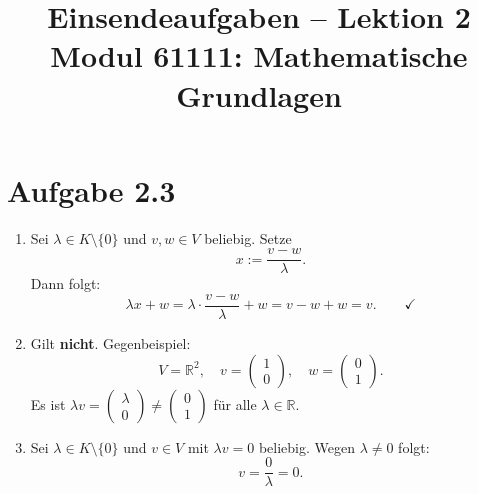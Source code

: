 \documentclass[a4paper,12pt]{article}
\title{Einsendeaufgaben -- Lektion 2\\[0.5em]
\large Modul 61111: Mathematische Grundlagen}
\author{}
\date{}
\begin{document}
\maketitle

\section*{Aufgabe 2.3}

\begin{enumerate}[label=\alph*)]

\item Sei $\lambda \in K \setminus \{0\}$ und $v, w \in V$ beliebig. Setze
\[
  x := \frac{v - w}{\lambda}.
\]
Dann folgt:
\[
  \lambda x + w = \lambda \cdot \frac{v - w}{\lambda} + w = v - w + w = v. \qquad \checkmark
\]

\item Gilt \textbf{nicht}. Gegenbeispiel:
\[
  V = \mathbb{R}^2, \quad v = \begin{pmatrix}1\\0\end{pmatrix}, \quad w = \begin{pmatrix}0\\1\end{pmatrix}.
\]
Es ist $\lambda v = \begin{pmatrix}\lambda\\0\end{pmatrix} \neq \begin{pmatrix}0\\1\end{pmatrix}$ für alle $\lambda \in \mathbb{R}$.

\item Sei $\lambda \in K \setminus \{0\}$ und $v \in V$ mit $\lambda v = 0$ beliebig.
Wegen $\lambda \neq 0$ folgt:
\[
  v = \frac{0}{\lambda} = 0.
\]

\end{enumerate}
\end{document}
